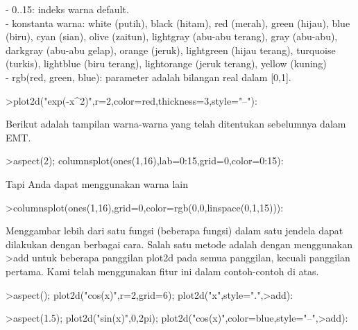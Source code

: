 \documentclass[a4paper,10pt]{article}
\begin{document}
\begin{eulernotebook}
\begin{eulercomment}
\begin{eulercomment}
\begin{eulercomment}
\begin{eulercomment}
\begin{eulercomment}
\begin{eulercomment}
\begin{eulercomment}
- 0..15: indeks warna default.\\
- konstanta warna: white (putih), black (hitam), red (merah), green
(hijau), blue (biru), cyan (sian), olive (zaitun), lightgray (abu-abu
terang), gray (abu-abu), darkgray (abu-abu gelap), orange (jeruk),
lightgreen (hijau terang), turquoise (turkis), lightblue (biru
terang), lightorange (jeruk terang), yellow (kuning)\\
- rgb(red, green, blue): parameter adalah bilangan real dalam [0,1].
\end{eulercomment}
\begin{eulerprompt}
>plot2d("exp(-x^2)",r=2,color=red,thickness=3,style="--"):
\end{eulerprompt}
\begin{eulercomment}
Berikut adalah tampilan warna-warna yang telah ditentukan sebelumnya
dalam EMT.
\end{eulercomment}
\begin{eulerprompt}
>aspect(2); columnsplot(ones(1,16),lab=0:15,grid=0,color=0:15):
\end{eulerprompt}
\begin{eulercomment}
Tapi Anda dapat menggunakan warna lain
\end{eulercomment}
\begin{eulerprompt}
>columnsplot(ones(1,16),grid=0,color=rgb(0,0,linspace(0,1,15))):
\end{eulerprompt}
\begin{eulercomment}
Menggambar lebih dari satu fungsi (beberapa fungsi) dalam satu jendela
dapat dilakukan dengan berbagai cara. Salah satu metode adalah dengan
menggunakan \textgreater{}add untuk beberapa panggilan plot2d pada semua panggilan,
kecuali panggilan pertama. Kami telah menggunakan fitur ini dalam
contoh-contoh di atas.
\end{eulercomment}
\begin{eulerprompt}
>aspect(); plot2d("cos(x)",r=2,grid=6); plot2d("x",style=".",>add):
\end{eulerprompt}
\begin{eulerprompt}
>aspect(1.5); plot2d("sin(x)",0,2pi); plot2d("cos(x)",color=blue,style="--",>add):
\end{eulerprompt}

\end{eulercomment}
\end{eulercomment}
\end{eulercomment}
\end{eulercomment}
\end{eulercomment}
\end{eulercomment}
\end{eulernotebook}
\end{document}
